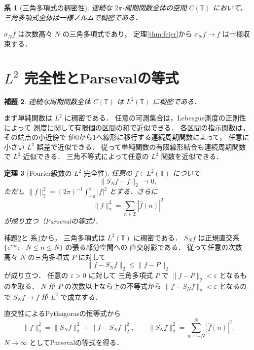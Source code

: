 \documentclass[a5paper,10pt,onecolumn]{jsarticle}
\makeatletter
\theoremstyle{mathnotetheorem}
\newtheorem{theorem}{定理}[section]
\newtheorem{lemma}[theorem]{補題}
\newtheorem{corollary}[theorem]{系}
\renewcommand{\proofname}{証明}
\renewenvironment{proof}[1][\proofname]{%
  \par\pushQED{\qed}\normalfont\topsep4\p@\@plus2\p@\relax
  \trivlist\item[\hskip\labelsep\bfseries #1]\ignorespaces
}{\popQED\endtrivlist\@endpefalse}
\newcommand{\norm}[1]{\lVert #1\rVert}
\makeatother
\begin{document}
\begin{corollary}[三角多項式の稠密性]\label{cor:trig-dense}
連続な $2\pi$-周期関数全体の空間
$C(\mathbb T)$ において，
三角多項式全体は一様ノルムで稠密である．
\end{corollary}
\begin{proof}
$\sigma_Nf$ は次数高々 $N$ の三角多項式であり，
定理\ref{thm:fejer}から $\sigma_Nf\to f$ は一様収束する．
\end{proof}

\section{$L^2$ 完全性とParsevalの等式}

\begin{lemma}\label{lem:continuous-l2}
連続な周期関数全体 $C(\mathbb T)$ は
$L^2(\mathbb T)$ に稠密である．
\end{lemma}
\begin{proof}
まず単純関数は $L^2$ に稠密である．
任意の可測集合は，Lebesgue測度の正則性によって
測度に関して有限個の区間の和で近似できる．
各区間の指示関数は，その端点の小近傍で
値0から1へ線形に移行する連続周期関数によって，
任意に小さい $L^2$ 誤差で近似できる．
従って単純関数の有限線形結合も連続周期関数で
$L^2$ 近似できる．
三角不等式によって任意の $L^2$ 関数を近似できる．
\end{proof}

\begin{theorem}[Fourier級数の $L^2$ 完全性]\label{thm:l2}
任意の $f\in L^2(\mathbb T)$ について
\[
 \norm{S_Nf-f}_2\longrightarrow0,
\]
ただし $\norm f_2^2=(2\pi)^{-1}\int_{-\pi}^\pi|f|^2$
とする．さらに
\[
 \norm f_2^2=\sum_{n\in\mathbb Z}|\widehat f(n)|^2
\]
が成り立つ（Parsevalの等式）．
\end{theorem}
\begin{proof}
補題\ref{lem:continuous-l2}と
系\ref{cor:trig-dense}から，
三角多項式は $L^2(\mathbb T)$ に稠密である．
$S_Nf$ は正規直交系
$\{e^{int}:-N\le n\le N\}$ の張る部分空間への
直交射影である．
従って任意の次数高々 $N$ の三角多項式 $P$ に対して
\[
 \norm{f-S_Nf}_2\le\norm{f-P}_2
\]
が成り立つ．
任意の $\varepsilon>0$ に対して
三角多項式 $P$ で $\norm{f-P}_2<\varepsilon$ となるものを取る．
$N$ が $P$ の次数以上なら上の不等式から
$\norm{f-S_Nf}_2<\varepsilon$ となるので
$S_Nf\to f$ が $L^2$ で成立する．

直交性によるPythagorasの恒等式から
\[
 \norm f_2^2=\norm{S_Nf}_2^2+\norm{f-S_Nf}_2^2,
 \qquad
 \norm{S_Nf}_2^2=\sum_{n=-N}^N|\widehat f(n)|^2.
\]
$N\to\infty$ としてParsevalの等式を得る．
\end{proof}
\end{document}
